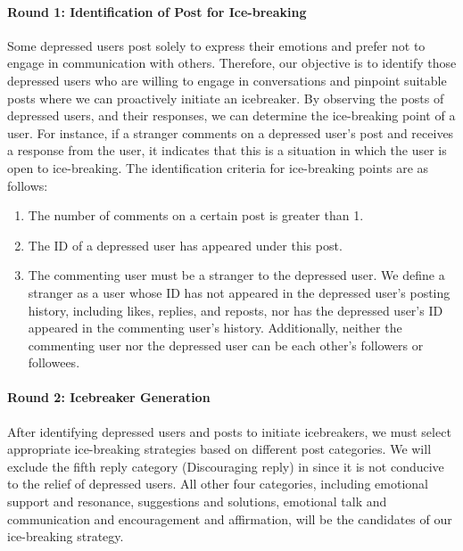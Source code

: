 \paragraph{Round 1: Identification of Post for Ice-breaking}
\label{sec:IBP}
Some depressed users post solely to express their emotions and prefer not to engage in communication with others. Therefore, our objective is to identify those depressed users who are willing to engage in conversations and pinpoint suitable posts where we can proactively initiate an icebreaker. By observing the posts of depressed users, and their responses, we can determine the 
ice-breaking point of a user. For instance, if a stranger comments on a depressed user's post and receives a response from the user, it indicates that this is a situation in which the user is open to ice-breaking.
The identification criteria for ice-breaking points are as follows:
\begin{enumerate}
	\item The number of comments on a certain post is greater than 1.
	\item The ID of a depressed user has appeared under this post.
    	\item The commenting user must be a stranger to the depressed user.  We define a stranger as a user whose ID has not appeared in the depressed user's posting history, including likes, replies, and reposts, nor has the depressed user's ID appeared in the commenting user's history.  Additionally, neither the commenting user nor the depressed user can be each other's followers or followees.
\end{enumerate}

\paragraph{Round 2: Icebreaker Generation}
After identifying depressed users and posts to initiate icebreakers, we must select appropriate ice-breaking strategies based on different post categories. We will exclude the fifth reply category (Discouraging reply) in  since it is not conducive to the 
relief of depressed users. All other four categories, including emotional support and resonance, suggestions and solutions, emotional talk and communication and encouragement and affirmation, will be the
candidates of our ice-breaking strategy. 

